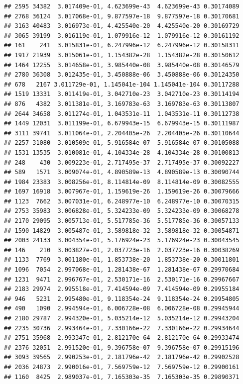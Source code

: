 \documentclass[
]{article}
\begin{document}
\begin{verbatim}
## 2595 34382  3.017409e-01, 4.623699e-43  4.623699e-43 0.30174089
## 2768 36124  3.017068e-01, 9.877597e-18  9.877597e-18 0.30170681
## 3163 40483  3.016973e-01, 4.425540e-20  4.425540e-20 0.30169729
## 3065 39199  3.016119e-01, 1.079916e-12  1.079916e-12 0.30161192
## 161    241  3.015831e-01, 6.247996e-12  6.247996e-12 0.30158311
## 1917 21939  3.015061e-01, 1.154382e-28  1.154382e-28 0.30150612
## 1464 12255  3.014658e-01, 3.985440e-08  3.985440e-08 0.30146579
## 2780 36308  3.012435e-01, 3.450888e-06  3.450888e-06 0.30124350
## 678   2167 3.011729e-01, 1.145041e-104 1.145041e-104 0.30117288
## 1519 13331  3.011419e-01, 3.042710e-23  3.042710e-23 0.30114194
## 876   4382  3.011381e-01, 3.169783e-63  3.169783e-63 0.30113807
## 2644 34658  3.011274e-01, 1.043531e-11  1.043531e-11 0.30112738
## 1449 12031  3.011199e-01, 6.679943e-15  6.679943e-15 0.30111987
## 3111 39741  3.011064e-01, 2.204405e-26  2.204405e-26 0.30110644
## 2257 31080  3.010509e-01, 5.916584e-07  5.916584e-07 0.30105088
## 1531 13535  3.010081e-01, 4.104334e-28  4.104334e-28 0.30100813
## 248    430  3.009223e-01, 2.717495e-37  2.717495e-37 0.30092227
## 589   1571  3.009074e-01, 4.890589e-13  4.890589e-13 0.30090744
## 1984 23383  3.008256e-01, 8.114814e-09  8.114814e-09 0.30082555
## 1697 16918  3.007967e-01, 1.159619e-26  1.159619e-26 0.30079666
## 1123  7662  3.007031e-01, 6.248977e-10  6.248977e-10 0.30070315
## 2753 35983  3.006828e-01, 5.324233e-09  5.324233e-09 0.30068278
## 2170 29095  3.005713e-01, 5.517785e-36  5.517785e-36 0.30057133
## 1590 14829  3.005487e-01, 3.589818e-32  3.589818e-32 0.30054871
## 2003 24133  3.004354e-01, 5.176924e-23  5.176924e-23 0.30043545
## 146    210  3.003827e-01, 2.037723e-16  2.037723e-16 0.30038269
## 1133  7769  3.001180e-01, 1.853738e-20  1.853738e-20 0.30011801
## 1096  7054  2.997068e-01, 1.281438e-67  1.281438e-67 0.29970684
## 1231  9471  2.996767e-01, 2.530171e-16  2.530171e-16 0.29967667
## 2183 29974  2.995518e-01, 7.414594e-09  7.414594e-09 0.29955184
## 946   5231  2.995480e-01, 9.118354e-24  9.118354e-24 0.29954805
## 490   1090  2.994594e-01, 6.006728e-08  6.006728e-08 0.29945944
## 2180 29787  2.994320e-01, 5.035214e-12  5.035214e-12 0.29943204
## 2235 30736  2.993464e-01, 7.330166e-22  7.330166e-22 0.29934644
## 2751 35968  2.993347e-01, 2.812170e-64  2.812170e-64 0.29933474
## 2376 32051  2.991520e-01, 9.396758e-07  9.396758e-07 0.29915196
## 3093 39565  2.990253e-01, 2.181796e-42  2.181796e-42 0.29902528
## 2036 24873  2.990016e-01, 7.569759e-12  7.569759e-12 0.29900161
## 1160  8425  2.989037e-01, 7.165303e-35  7.165303e-35 0.29890371

\end{verbatim}
\end{document}
